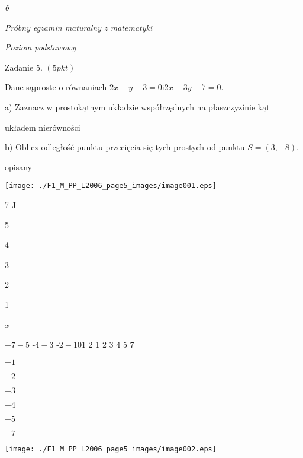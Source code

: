 \documentclass[a4paper,12pt]{article}
\begin{document}
{\it 6}

{\it Próbny egzamin maturalny z matematyki}

{\it Poziom podstawowy}

Zadanie 5. $(5pkt)$

Dane sąproste o równaniach $2x-y-3=0\mathrm{i}2x-3y-7=0.$

a) Zaznacz w prostokątnym układzie współrzędnych na płaszczyzínie kąt

układem nierówności 

b) Oblicz odległość punktu przecięcia się tych prostych od punktu $S=(3,-8).$

opisany
\begin{center}
\texttt{[image: ./F1\_M\_PP\_L2006\_page5\_images/image001.eps]}
\end{center}
7 J

5

4

3

2

1

{\it x}

$-7  -5$ -$4  -3$ -$2  -1 0 1$ 2  1 2 3 4 5  7

$-1$

$-2$

$-3$

$-4$

$-5$

$-7$
\begin{center}
\texttt{[image: ./F1\_M\_PP\_L2006\_page5\_images/image002.eps]}
\end{center}
\end{document}

